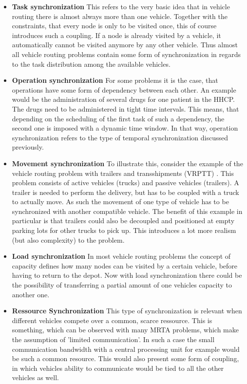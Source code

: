 \begin{itemize}
\item \textbf{Task synchronization} This refers to the very basic idea that in vehicle routing there is almost always more than one vehicle. Together with the constraints, that every node is only to be visited once, this of course introduces such a coupling. If a node is already visited by a vehicle, it automatically cannot be visited anymore by any other vehicle. Thus almost all vehicle routing problems contain some form of synchronization in regards to the task distribution among the available vehicles.
\item \textbf{Operation synchronization} For some problems it is the case, that operations have some form of dependency between each other. An example would be the administration of several drugs for one patient in the HHCP. The drugs need to be administered in tight time intervals. This means, that depending on the scheduling of the first task of such a dependency, the second one is imposed with a dynamic time window. In that way, operation synchronization refers to the type of temporal synchronization discussed previously.
\item \textbf{Movement synchronization} To illustrate this, consider the example of the vehicle routing problem with trailers and transshipments (VRPTT) \cite{drexel_phd?}. This problem consists of active vehicles (trucks) and passive vehicles (trailers). A trailer is needed to perform the delivery, but has to be coupled with a truck to actually move. As such the movement of one type of vehicle has to be synchronized with another compatible vehicle. The benefit of this example in particular is that trailers could also be decoupled and positioned at empty parking lots for other trucks to pick up. This introduces a lot more realism (but also complexity) to the problem.
\item \textbf{Load synchronization} In most vehicle routing problems the concept of capacity defines how many nodes can be visited by a certain vehicle, before having to return to the depot. Now with load synchronization there could be the possibility of transferring a partial amount of one vehicles capacity to another one.
\item \textbf{Ressource Synchronization} This type of synchronization is relevant when different vehicles compete over a common, scarce ressource. This is something, which can be observed with many MRTA problems, which make the assumption of 'limited communication'. In such a case the small communication bandwidth with a central processing unit for example would be such a common resource. This would also present some form of coupling, in which vehicles ability to communicate would be tied to all the other vehicles as well.
\end{itemize}

